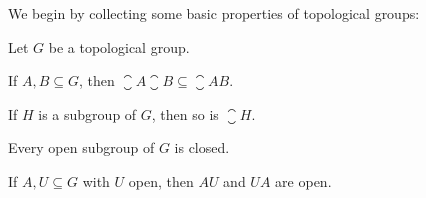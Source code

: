 \documentclass[article, a4paper, 11pt, oneside]{memoir}
\numberwithin{equation}{chapter}
\begin{document}
We begin by collecting some basic properties of topological groups:

\begin{proposition}
    Let $G$ be a topological group.
    \begin{enumprop}
        \item \label{enum:closure_of_product} If $A,B \subseteq G$, then $\closure{A} \closure{B} \subseteq \closure{AB}$.
        \item \label{enum:closure_of_subgroup} If $H$ is a subgroup of $G$, then so is $\closure{H}$.
        \item \label{enum:open_subgroup_is_closed} Every open subgroup of $G$ is closed.
        \item \label{enum:product_open_set} If $A,U \subseteq G$ with $U$ open, then $AU$ and $UA$ are open.
    \end{enumprop}
\end{proposition}
\end{document}
